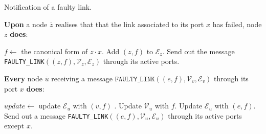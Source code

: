 \begin{algorithm}[htbp]
\caption{Notification of a faulty link.}
\label{al:lfailure_notif}

\textbf{Upon} a node $\overline{z}$ realises that that the link associated to its port $x$ has failed, node $\overline{z}$ \textbf{does}:

\begin{algorithmic}[1]
	\STATE $f\leftarrow$ the canonical form of $z\cdot x$.
    \STATE Add $(z,f)$ to $\mathcal{E}_{z}$.
    \STATE Send out the message \texttt{FAULTY\_LINK}$((z,f),\mathcal{V}_z, \mathcal{E}_z)$ through its active ports.
\end{algorithmic}

\textbf{Every} node 
     $\overline{u}$ receiving a message $\texttt{FAULTY\_LINK}((e,f),\mathcal{V}_v, \mathcal{E}_v)$ through its port $x$ \textbf{does}:

\begin{algorithmic}[1]
	\STATE $update\leftarrow$ update $\mathcal{E}_u$ with $(v,f)$ .
    	\STATE Update $\mathcal{V}_u$ with $f$. 
    \ENDFOR
    	\STATE Update $\mathcal{E}_u$ with $(e,f)$. 
    \ENDFOR
    	\STATE Send out a message \texttt{FAULTY\_LINK}$((e,f),\mathcal{V}_u, \mathcal{E}_u)$ through its active ports except $x$.
    \ENDIF
\end{algorithmic}
\end{algorithm}